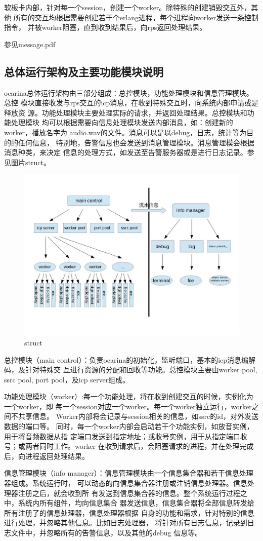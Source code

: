 \documentclass[11pt]{article}
\begin{document}
    软板卡内部，针对每一个session，创建一个worker。除特殊的创建销毁交互外，其他
    所有的交互均根据需要创建若干个erlang进程，每个进程向worker发送一条控制指令，
    并被worker阻塞，直到收到结果后，向rps返回处理结果。

    参见message.pdf

\clearpage
\subsection{总体运行架构及主要功能模块说明}
    ocarina总体运行架构由三部分组成：总控模块，功能处理模块和信息管理模块。总控
    模块直接收发与rps交互的icp消息，在收到特殊交互时，向系统内部申请或是释放资
    源。功能处理模块主要处理实际的请求，并返回处理结果。总控模块和功能处理模块
    均可以根据需要向信息处理模块发送内部消息，如：创建新的worker，播放名字为
    audio.wav的文件。消息可以是以debug，日志，统计等为目的的任何信息，
    特别地，告警信息也会发送到消息管理模块。消息管理模会根据消息种类，来决定
    信息的处理方式，如发送至告警服务器或是进行日志记录。参见图片struct。

\begin{figure}[h!]
    \centering
        \includegraphics[width=1.0\textwidth]{struct.jpg}
    \caption{struct}
\end{figure}

    总控模块（main control）：负责ocarina的初始化，监听端口，基本的icp消息编解码，及针对特殊交
    互进行资源的分配和回收等功能。总控模块主要由worker pool, ssrc pool, port
    pool，及icp server组成。

    功能处理模块（worker）:每一个功能处理，将在收到创建交互的时候，实例化为一个worker，即
    每一个session对应一个worker。每一个worker独立运行，worker之间不共享信息。
    Worker内部将会记录与session相关的信息，如ssrc的id，对外发送数据的端口等。
    同时，每一个worker内部会启动若干个功能实例，如放音实例，用于将音频数据从指
    定端口发送到指定地址；或收号实例，用于从指定端口收号；或两者同时工作。worker
    在收到请求后，会阻塞请求的进程，并在处理完成后，向进程返回处理结果。

    信息管理模块（info manager）：信息管理模块由一个信息集合器和若干信息处理器组成。系统运行时，
    可以动态的向信息集合器注册或注销信息处理器。信息处理器注册之后，就会收到所
    有发送到信息集合器的信息。整个系统运行过程之中，系统内所有组件，均向信息集合
    器发送信息，信息集合器将全部信息转发给所有注册了的信息处理器，信息处理器根据
    自身的功能和需求，针对特别的信息进行处理，并忽略其他信息。比如日志处理器，
    将针对所有日志信息，记录到日志文件中，并忽略所有的告警信息，以及其他的debug
    信息等。
\end{document}
